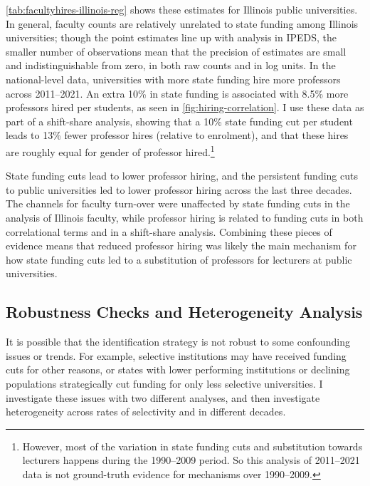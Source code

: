 \autoref{tab:facultyhires-illinois-reg} shows these estimates for Illinois public universities.
In general, faculty counts are relatively unrelated to state funding among Illinois universities; though the point estimates line up with analysis in IPEDS, the smaller number of observations mean that the precision of estimates are small and indistinguishable from zero, in both raw counts and in log units.
In the national-level \cite{wapman2022quantifying} data, universities with more state funding hire more professors across 2011--2021.
An extra 10\% in state funding is associated with 8.5\% more professors hired per students, as seen in \autoref{fig:hiring-correlation}.
I use these data as part of a shift-share analysis, showing that a 10\% state funding cut per student leads to 13\% fewer professor hires (relative to enrolment), and that these hires are roughly equal for gender of professor hired.\footnote{
    However, most of the variation in state funding cuts and substitution towards lecturers happens during the 1990--2009 period.
    So this analysis of 2011--2021 data is not ground-truth evidence for mechanisms over 1990--2009.
}

State funding cuts lead to lower professor hiring, and the persistent funding cuts to public universities led to lower professor hiring across the last three decades.
The channels for faculty turn-over were unaffected by state funding cuts in the analysis of Illinois faculty, while professor hiring is related to funding cuts in both correlational terms and in a shift-share analysis.
Combining these pieces of evidence means that reduced professor hiring was likely the main mechanism for how state funding cuts led to a substitution of professors for lecturers at public universities.

\subsection{Robustness Checks and Heterogeneity Analysis}
\label{sec:results-robustness}
It is possible that the identification strategy is not robust to some confounding issues or trends.
For example, selective institutions may have received funding cuts for other reasons, or states with lower performing institutions or declining populations strategically cut funding for only less selective universities.
I investigate these issues with two different analyses, and then investigate heterogeneity across rates of selectivity and in different decades.

